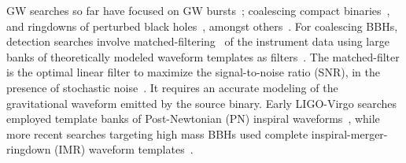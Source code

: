 GW searches so far have focused on GW bursts~\cite{Abadie:2010mt,
Abadie:2010wx,Abadie:2012rq}; coalescing compact
binaries~\cite{Colaboration:2011nz,Abadie:2010yb,Abbott:2009qj,
Abbott:2009tt,Messaritaki:2005wv,Abadie:2011kd,Aasi:2012rja},
and ringdowns of perturbed black holes~\cite{Abbott:2009km}, amongst
others~\cite{Abbott:2003yq,Abbott:2005pu,Sintes:2005fp,Abadie:2011md,
Palomba:2012wn}. For coalescing BBHs, detection searches involve 
matched-filtering~\cite{Wainstein:1962,Allen:2005fk} of the instrument
data using large banks of theoretically modeled waveform templates
as filters~\cite{Sathyaprakash:1991mt,SathyaMetric2PN,OwenTemplateSpacing,
BabaketalBankPlacement,SathyaBankPlacementTauN,Cokelaer:2007kx}.
The matched-filter is the optimal linear filter to maximize the
signal-to-noise ratio (SNR), in the presence of stochastic 
noise~\cite{1057571}. It requires an accurate modeling of the gravitational 
waveform emitted by the source binary. Early LIGO-Virgo searches 
employed template banks of Post-Newtonian (PN) inspiral 
waveforms~\cite{Colaboration:2011nz,Abadie:2010yb,Abbott:2009qj,
Abbott:2009tt,Messaritaki:2005wv}, while more recent
searches targeting high mass BBHs used complete inspiral-merger-ringdown
(IMR) waveform templates~\cite{Abadie:2011kd,Aasi:2012rja}. 


